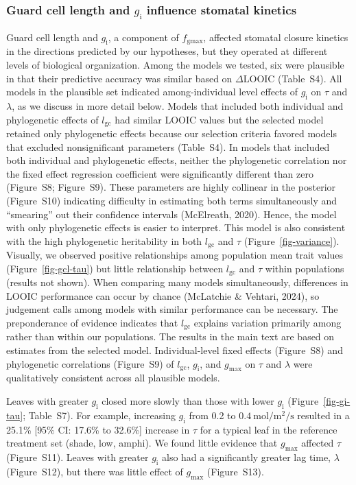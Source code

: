 \documentclass[
  letterpaper,
  DIV=11,
  numbers=noendperiod]{scrartcl}
\newcommand{\fgmax}{$f_\mathrm{gmax}$}
\newcommand{\gcl}{$l_\mathrm{gc}$}
\newcommand{\gi}{$g_\mathrm{i}$}
\newcommand{\gmax}{$g_\mathrm{max}$}
\begin{document}
\subsubsection{\texorpdfstring{Guard cell length and \gi{} influence
stomatal
kinetics}{Guard cell length and  influence stomatal kinetics}}\label{guard-cell-length-and-influence-stomatal-kinetics}

Guard cell length and \gi{}, a component of \fgmax, affected stomatal
closure kinetics in the directions predicted by our hypotheses, but they
operated at different levels of biological organization. Among the
models we tested, six were plausible in that their predictive accuracy
was similar based on \(\Delta \mathrm{LOOIC}\)
(Table~S4). All models in the plausible set indicated
among-individual level effects of \gi{} on \(\tau\) and \(\lambda\), as
we discuss in more detail below. Models that included both individual
and phylogenetic effects of \gcl{} had similar LOOIC values but the
selected model retained only phylogenetic effects because our selection
criteria favored models that excluded nonsignificant parameters
(Table~S4). In models that included both individual
and phylogenetic effects, neither the phylogenetic correlation nor the
fixed effect regression coefficient were significantly different than
zero (Figure~S8; Figure~S9).
These parameters are highly collinear in the posterior
(Figure~S10) indicating difficulty in estimating both
terms simultaneously and ``smearing'' out their confidence intervals
(McElreath, 2020). Hence, the model with only phylogenetic effects is
easier to interpret. This model is also consistent with the high
phylogenetic heritability in both \gcl{} and \(\tau\)
(Figure~\ref{fig-variance}). Visually, we observed positive
relationships among population mean trait values
(Figure~\ref{fig-gcl-tau}) but little relationship between \gcl{} and
\(\tau\) within populations (results not shown). When comparing many
models simultaneously, differences in LOOIC performance can occur by
chance (McLatchie \& Vehtari, 2024), so judgement calls among models
with similar performance can be necessary. The preponderance of evidence
indicates that \gcl{} explains variation primarily among rather than
within our populations. The results in the main text are based on
estimates from the selected model. Individual-level fixed effects
(Figure~S8) and phylogenetic correlations
(Figure~S9) of \gcl, \gi, and \gmax{} on \(\tau\)
and \(\lambda\) were qualitatively consistent across all plausible
models.

Leaves with greater \gi{} closed more slowly than those with lower \gi{}
(Figure~\ref{fig-gi-tau}; Table~S7). For example,
increasing \gi{} from 0.2 to
\(\SI{0.4}{\mole\per\meter\squared\per\second}\) resulted in a 25.1\%
{[}95\% CI: 17.6\% to 32.6\%{]} increase in \(\tau\) for a typical leaf
in the reference treatment set (shade, low, amphi). We found little
evidence that \gmax{} affected \(\tau\) (Figure~S11).
Leaves with greater \gi{} also had a significantly greater lag time,
\(\lambda\) (Figure~S12), but there was little effect of
\gmax{} (Figure~S13).
\end{document}
